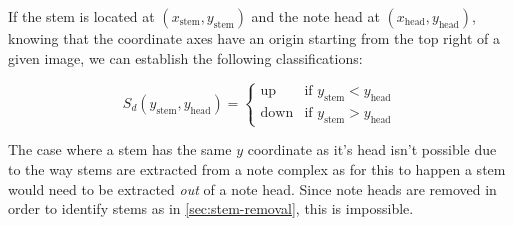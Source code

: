 If the stem is located at $(x_{\text{stem}}, y_{\text{stem}})$ and the note head at $(x_{\text{head}}, y_{\text{head}})$, knowing that the coordinate axes have an origin starting from the top right of a given image, we can establish the following classifications:

$$
S_{d} (y_{\text{stem}}, y_{\text{head}}) =
\left\{
    \begin{array}{ll}
        \text{up}   & \mbox{if } y_{\text{stem}} < y_{\text{head}} \\
        \text{down} & \mbox{if } y_{\text{stem}} > y_{\text{head}}
    \end{array}
\right.
$$

The case where a stem has the same $y$ coordinate as it's head isn't possible due to the way stems are extracted from a note complex as for this to happen a stem would need to be extracted \emph{out} of a note head. Since note heads are removed in order to identify stems as in \cref{sec:stem-removal}, this is impossible.

